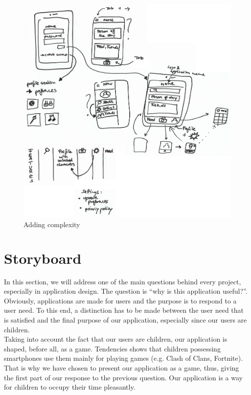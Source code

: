 \documentclass[12pt]{scrartcl}
\begin{document}
	\begin{figure}[H]
        		\centering
       		\includegraphics[width=\textwidth]{../images/design3.jpg}
       		\caption{Adding complexity}
        		\label{sketch3}
	\end{figure}
	
	
\section{Storyboard}
	

	In this section, we will address one of the main questions behind every project, especially in application design. The question is ``why is this application useful?”. Obviously, applications are made for users and the purpose is to respond to a user need. To this end, a distinction has to be made between the user need that is satisfied and the final purpose of our application, especially since our users are children.\\

	Taking into account the fact that our users are children, our application is shaped, before all, as a game. Tendencies shows that children possessing smartphones use them mainly for playing games (e.g. Clash of Clans, Fortnite). That is why we have chosen to present our application as a game, thus, giving the first part of our response to the previous question. Our application is a way for children to occupy their time pleasantly.\\
\end{document}
